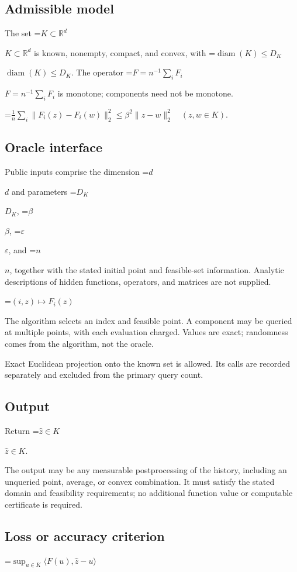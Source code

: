 \documentclass[10pt,a4paper]{article}
\newcommand{\AtlasMath}[1]{\par\begingroup\centering\setbox0=\hbox{$\displaystyle #1$}\ifdim\wd0>1.4\linewidth\typeout{ATLAS WIDE FORMULA: \the\wd0}\fi\ifdim\wd0>\linewidth\resizebox{\linewidth}{!}{\box0}\else\box0\fi\par\endgroup}
\newcommand{\AtlasInlineMath}[1]{\begingroup\setbox0=\hbox{$#1$}\ifdim\wd0>.4\linewidth\endgroup\AtlasMath{#1}\else\endgroup$#1$\fi}
\begin{document}
\subsection{Admissible model}
The set \AtlasInlineMath{K\subset\mathbb{R}^d} is known, nonempty, compact, and convex, with \AtlasInlineMath{\operatorname{diam}(K)\le D_K}. The operator \AtlasInlineMath{F=n^{-1}\sum_iF_i} is monotone; components need not be monotone.


\AtlasMath{\frac1n\sum_i\|F_i(z)-F_i(w)\|_2^2\le\beta^2\|z-w\|_2^2\quad(z,w\in K).}


\subsection{Oracle interface}
Public inputs comprise the dimension \AtlasInlineMath{d} and parameters \AtlasInlineMath{D_K}, \AtlasInlineMath{\beta}, \AtlasInlineMath{\varepsilon}, and \AtlasInlineMath{n}, together with the stated initial point and feasible-set information. Analytic descriptions of hidden functions, operators, and matrices are not supplied.


\AtlasMath{(i,z)\longmapsto F_i(z)}


The algorithm selects an index and feasible point. A component may be queried at multiple points, with each evaluation charged. Values are exact; randomness comes from the algorithm, not the oracle.

Exact Euclidean projection onto the known set is allowed. Its calls are recorded separately and excluded from the primary query count.

\subsection{Output}
Return \AtlasInlineMath{\widehat{z}\in K}.

The output may be any measurable postprocessing of the history, including an unqueried point, average, or convex combination. It must satisfy the stated domain and feasibility requirements; no additional function value or computable certificate is required.

\subsection{Loss or accuracy criterion}

\AtlasMath{\sup_{u\in K}\langle F(u),\widehat{z}-u\rangle}
\end{document}
